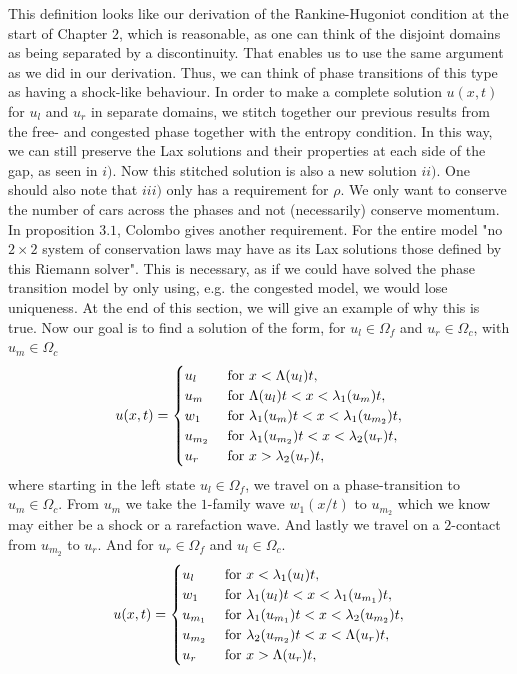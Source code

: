\documentclass[10pt]{article}
\numberwithin{equation}{section}
\begin{document}
This definition looks like our derivation of the Rankine-Hugoniot condition at the start of Chapter $2$, which is reasonable, as one can think of the disjoint domains as being separated by a discontinuity. That enables us to use the same argument as we did in our derivation. Thus, we can think of phase transitions of this type as having a shock-like behaviour.
In order to make a complete solution $u(x,t)$ for $u_l$ and $u_r$ in separate domains, we stitch together our previous results from the free- and congested phase together with the entropy condition. In this way, we can still preserve the Lax solutions and their properties at each side of the gap, as seen in $i)$. Now this stitched solution is also a new solution $ii)$. One should also note that $iii)$ only has a requirement for $\rho$. We only want to conserve the number of cars across the phases and not (necessarily) conserve momentum. In proposition $3.1$, Colombo gives another requirement. For the entire model "no $2 \times 2$ system of conservation laws may have as its Lax solutions those defined by this Riemann solver"\cite[p.~713]{Colombo2003}. This is necessary, as if we could have solved the phase transition model by only using, e.g. the congested model, we would lose uniqueness. At the end of this section, we will give an example of why this is true.
Now our goal is to find a solution of the form, for $u_l \in \Omega_f$ and $u_r \in \Omega_c$, with $u_m \in \Omega_c$
\begin{align}
    u(x,t) = \begin{cases}
        u_l & \text{ for $ x < \Lambda(u_l)t$}, \\
        u_{m} & \text{ for $ \Lambda(u_l)t < x < \lambda_1(u_{m})t$}, \\
        w_1 & \text{ for $\lambda_1(u_{m})t < x < \lambda_1(u_{m_2})t $}, \\
        u_{m_2} & \text{ for $ \lambda_1(u_{m_2})t < x < \lambda_2(u_{r})t$}, \\
        u_r & \text{ for $x > \lambda_2( u_r)t$},
    \end{cases}
    \label{Eq:APrioriFreeToCong}
\end{align}
where starting in the left state $u_l \in \Omega_f$, we travel on a phase-transition to $u_m \in \Omega_c$. From $u_m$ we take the $1$-family wave $w_1(x/t)$ to $u_{m_2}$ which we know may either be a shock or a rarefaction wave. And lastly we travel on a $2$-contact from $u_{m_2}$ to $u_r$. And for $u_r \in \Omega_f$ and $u_l \in \Omega_c$.
\begin{align}
    u(x,t) = \begin{cases}
        u_l & \text{ for $ x < \lambda_1(u_l)t$}, \\
        w_1 & \text{ for $ \lambda_1(u_l)t < x < \lambda_1(u_{m_1})t$}, \\
        u_{m_1} & \text{ for $ \lambda_1(u_{m_1})t < x < \lambda_2(u_{m_2})t$}, \\
        u_{m_2} & \text{ for $ \lambda_2(u_{m_2})t < x < \Lambda( u_r)t $}, \\
        u_r & \text{ for $x > \Lambda( u_r)t$},
    \end{cases}
    \label{Eq:APrioriCongToFree}
\end{align}
\end{document}

